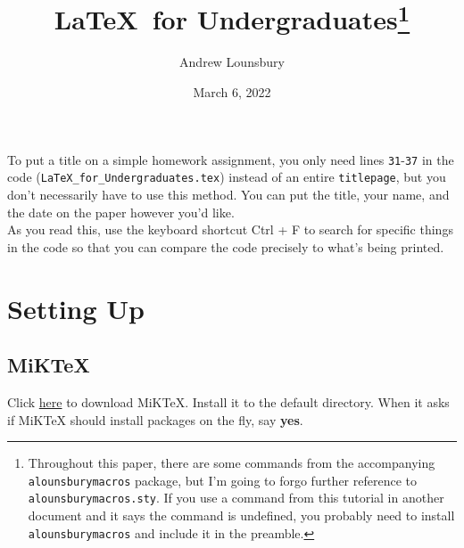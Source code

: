 \documentclass{article} 		%
\begin{document}
\begin{titlepage}
	\title{\bfseries \LaTeX\ for Undergraduates\footnote{
			Throughout this paper, there are some commands from the accompanying \texttt{alounsburymacros} package, but I'm going to forgo further reference to \texttt{alounsburymacros.sty}. If you use a command from this tutorial in another document and it says the command is undefined, you probably need to install \texttt{alounsburymacros} and include it in the preamble. 
		}
	}
	\author{Andrew Lounsbury}
	\date{March 6, 2022}
	\maketitle
	
	\vspace{1.5in}
	To put a title on a simple homework assignment, you only need lines \texttt{31}-\texttt{37} in the code (\texttt{LaTeX\_for\_Undergraduates.tex}) instead of an entire \texttt{titlepage}, but you don't necessarily have to use this method. You can put the title, your name, and the date on the paper however you'd like. \\

	As you read this, use the keyboard shortcut Ctrl + F to search for specific things in the code so that you can compare the code precisely to what's being printed. 
\end{titlepage}

\tableofcontents

\newpage
\section{Setting Up} \label{sec:setting-up}
\subsection{MiKTeX} \label{subsec:miktex}
Click \href{https://miktex.org/download}{here} to download MiKTeX. Install it to the default directory. When it asks if MiKTeX should install packages on the fly, say \textbf{yes}.
\end{document}
